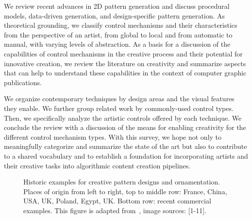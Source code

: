 We review recent advances in 2D pattern generation and discuss procedural models, data-driven generation, and design-specific pattern generation. As theoretical grounding, we classify control mechanisms and their characteristics from the perspective of an artist, from global to local and from automatic to manual, with varying levels of abstraction. As a basis for a discussion of the capabilities of control mechanisms in the creative process and their potential for innovative creation, we review the literature on creativity and summarize aspects that can help to understand these capabilities in the context of computer graphic publications.

We organize contemporary techniques by design areas and the visual features they enable. We further group related work by commonly-used control types. Then, we specifically analyze the artistic controls offered by each technique. 
We conclude the review with a discussion of the means for enabling creativity for the different control mechanism types. With this survey, we hope not only to meaningfully categorize and summarize the state of the art but also to contribute to a shared vocabulary and to establish a foundation for incorporating artists and their creative tasks into algorithmic content creation pipelines.

\begin{figure}
        \caption[Historic pattern examples]{\label{fig:historic_examples} Historic examples for creative pattern designs and ornamentation. Places of origin from left to right, top to middle row:  France, China, USA, UK, Poland, Egypt, UK. Bottom row: recent commercial examples. This figure is adapted from~\cite{gieseke_2017_ooo}, image sources: [1-11].}
\end{figure}
